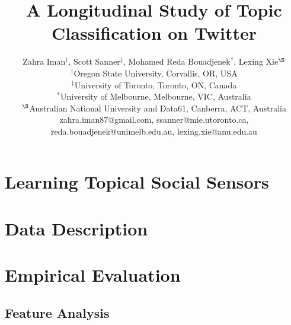 \documentclass[letterpaper]{article}
\begin{document}
%
\title{A Longitudinal Study of Topic Classification on Twitter}
\author {Zahra Iman$^{\dag}$, Scott Sanner$^{\ddagger}$, Mohamed Reda Bouadjenek$^{*}$, Lexing Xie$^{\S}$\\
	$^{\dag}$Oregon State University, Corvallis, OR, USA\\
	$^{\ddagger}$University of Toronto, Toronto, ON, Canada\\
	$^{*}$University of Melbourne, Melbourne, VIC, Australia\\
	$^{\S}$Australian National University and Data61, Canberra, ACT, Australia\\
	{\footnotesize zahra.iman87@gmail.com, ssanner@mie.utoronto.ca, reda.bouadjenek@unimelb.edu.au, lexing.xie@anu.edu.au}
}
\maketitle
\begin{abstract}

\end{abstract}

%

\section{Learning Topical Social Sensors}
\label{sec:lss}


\section{Data Description}
\label{sec:datasetStatistics}


\section{Empirical Evaluation}
\label{sec:methodology}


\subsection{Feature Analysis}
\label{label:featureanalysis}

\end{document}
